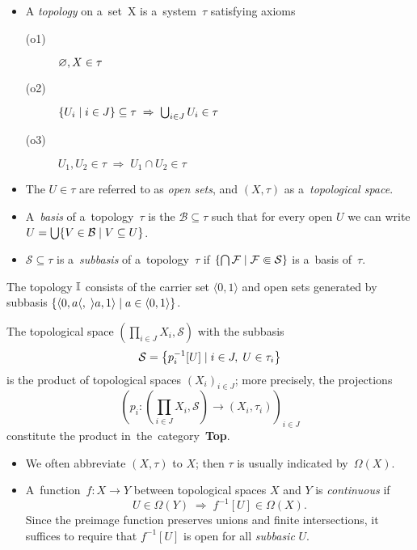 \begin{itemize}
\item A \emph{topology} on a~set~X is a~system~$\tau$ satisfying axioms
  \begin{description}
  \item[(o1)] $\varnothing, X \in \tau$
  \item[(o2)] $\left\{ U_i \mid i\in J \right\} \subseteq \tau \; \Rightarrow \;
  \bigcup_{i\in J} U_i \in \tau$
  \item[(o3)] $U_1, U_2 \in \tau \; \Rightarrow \; U_1 \cap U_2 \in \tau$
  \end{description}

\item The $U\in \tau$ are referred to as \emph{open sets\/}, and $(X, \tau)$ as
a~\emph{topological space\/}.

\item A~\emph{basis} of a~topology~$\tau$ is the $\mathcal{B}\subseteq \tau$
such that for every open $U$ we can write $U = \bigcup \{V\in \mathcal{B} \mid
V\subseteq U \}$.

\item $\mathcal{S}\subseteq \tau$ is a~\emph{subbasis} of a~topology~$\tau$ if
$\left\{ \bigcap \mathcal{F} \mid \mathcal{F} \Subset \mathcal{S} \right\}$ is
a~basis of~$\tau$.
\end{itemize}

\begin{exmpl}
  The topology $\mathbb{I}$ consists of the carrier set $\langle 0, 1 \rangle$ and open
  sets generated by subbasis $\{ \langle 0, a \langle, \; \rangle a, 1 \rangle
  \mid a\in \langle 0, 1 \rangle \}$.
\end{exmpl}

\begin{exmpl}
  The topological space $\left( \prod_{i\in J} X_i, \mathcal{S} \right)$ with
  the subbasis
  \[
    \mathcal{S} = \left\{ p_{i}^{-1}[U] \mid i\in J, \; U\in \tau_i \right\}
  \]
  is the product of topological spaces $\left( X_i \right)_{i\in J}$;
  more precisely, the projections
  \[
    \left( p_i\colon \left(\prod_{i\in J} X_i, \mathcal{S}\right) \to
    \left(X_i, \tau_i\right) \right)_{i\in J}
  \]
  constitute the product in~the~category~{\bf Top}.
\end{exmpl}

\begin{itemize}
\item We often abbreviate $(X, \tau)$ to $X$;
then $\tau$ is usually indicated by~$\Omega(X)$.

\item A~function~$f\colon X \to Y$ between topological spaces $X$ and $Y$ is
\emph{continuous} if 
\[
  U\in \Omega(Y) \; \Longrightarrow \; f^{-1}[U]\in \Omega(X).
\]
Since the preimage function preserves unions and finite intersections, it
suffices to require that $f^{-1}[U]$ is open for all \emph{subbasic\/} $U$.
\end{itemize}

